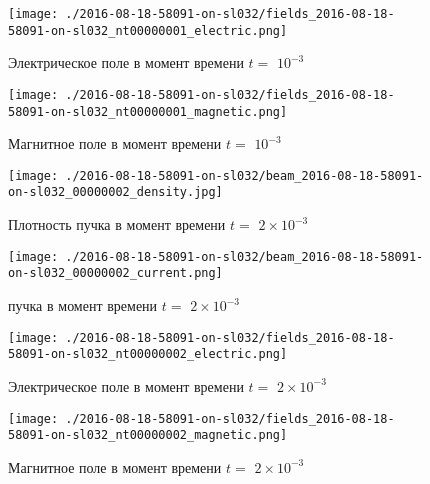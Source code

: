 \documentclass[a4paper,14pt]{extreport}
\begin{document}
\begin{center}
\begin{figure}[!hbt]
\texttt{[image: ./2016-08-18-58091-on-sl032/fields\_2016-08-18-58091-on-sl032\_nt00000001\_electric.png]}
\caption{\label{electric_1_6} Электрическое поле  в момент времени $t = $ $10^{-3}$ }
\end{figure}
\end{center}
\begin{center}
\begin{figure}[!hbt]
\texttt{[image: ./2016-08-18-58091-on-sl032/fields\_2016-08-18-58091-on-sl032\_nt00000001\_magnetic.png]}
\caption{\label{magnetic_1_7} Магнитное поле  в момент времени $t = $ $10^{-3}$ }
\end{figure}
\end{center}
\begin{center}
\begin{figure}[!hbt]
\texttt{[image: ./2016-08-18-58091-on-sl032/beam\_2016-08-18-58091-on-sl032\_00000002\_density.jpg]}
\caption{\label{density_beam2_8} Плотность пучка в момент времени $t = $ $2\times 10^{-3}$ }
\end{figure}
\end{center}
\begin{center}
\begin{figure}[!hbt]
\texttt{[image: ./2016-08-18-58091-on-sl032/beam\_2016-08-18-58091-on-sl032\_00000002\_current.png]}
\caption{\label{current_beam2_9}  пучка в момент времени $t = $ $2\times 10^{-3}$ }
\end{figure}
\end{center}
\begin{center}
\begin{figure}[!hbt]
\texttt{[image: ./2016-08-18-58091-on-sl032/fields\_2016-08-18-58091-on-sl032\_nt00000002\_electric.png]}
\caption{\label{electric_2_10} Электрическое поле  в момент времени $t = $ $2\times 10^{-3}$ }
\end{figure}
\end{center}
\begin{center}
\begin{figure}[!hbt]
\texttt{[image: ./2016-08-18-58091-on-sl032/fields\_2016-08-18-58091-on-sl032\_nt00000002\_magnetic.png]}
\caption{\label{magnetic_2_11} Магнитное поле  в момент времени $t = $ $2\times 10^{-3}$ }
\end{figure}
\end{center}
\end{document}
